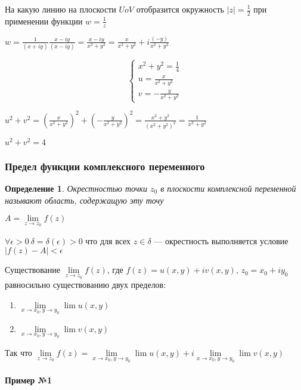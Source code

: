\documentclass{article}
\newtheorem{definition}{Определение}
\begin{document}
На какую линию на плоскости $U o V$ отобразится окружность $|z| = \frac{1}{2}$ при применении функции $w = \frac{1}{z}$

$w = \frac{1}{(x + i y)} \frac{x - i y}{(x - i y)} = \frac{x - i y}{x^2 + y^2} = \frac{x}{x^2 + y^2} + i \frac{(- y)}{x^2 + y^2}$

$$
\begin{cases}
    x^2 + y^2 = \frac{1}{4} \\
    u = \frac{x}{x^2 + y^2} \\
    v = -\frac{y}{x^2 + y^2}
\end{cases}
$$

$u^2 + v^2 = (\frac{x}{x^2 + y^2})^2 + (-\frac{y}{x^2 + y^2})^2 = \frac{x^2 + y^2}{(x^2 + y^2)^2} = \frac{1}{x^2 + y^2}$

$u^2 + v^2 = 4$

\subsubsection{Предел функции комплексного переменного}

\begin{definition}
    Окрестностью точки $z_0$ в плоскости комплексной переменной называют область, содержащую эту точу
\end{definition}

$A = \lim\limits_{z \to z_0} f(z)$

$\forall \epsilon > 0 \ \delta = \delta (\epsilon) > 0$ что для всех $z \in \delta$ — окрестность выполняется условие $| f(z) - A| < \epsilon$

\hfill

Существование $\lim\limits_{z \to z_0} f(z)$, где $f(z) = u(x, y) + i v(x, y)$, $z_0 = x_0 + i y_0$ равносильно существованию двух пределов:
\begin{enumerate}
    \item $\lim\limits_{x \to x_0, y \to y_0} \lim u(x, y)$
    \item $\lim\limits_{x \to x_0, y \to y_0} \lim v(x, y)$
\end{enumerate}

Так что $\lim\limits_{z \to z_0} f(z) = \lim\limits_{x \to x_0, y \to y_0} \lim u(x, y) + i \lim\limits_{x \to x_0, y \to y_0} \lim v(x, y)$

\paragraph{Пример №1}
\end{document}
